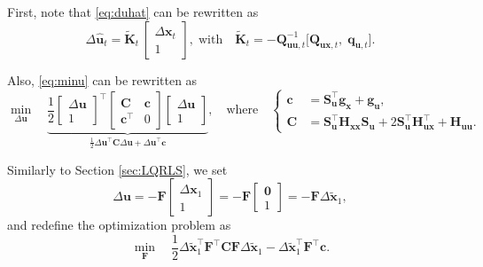 \documentclass[10pt,a4paper]{article} %
\newcommand{\trsp}{{\scriptscriptstyle\top}}
\begin{document}
First, note that \eqref{eq:duhat} can be rewritten as
\begin{equation}
	\Delta\bm{\hat{u}}_t = \bm{\tilde{K}}_t \, \begin{bmatrix} \Delta\bm{x}_t \\ 1 \end{bmatrix},
	\;\text{with}\quad
	\bm{\tilde{K}}_t = - \bm{Q}_{\bm{u}\bm{u},t}^{-1} \Big[ \bm{Q}_{\bm{u}\bm{x},t}, \; \bm{q}_{\bm{u},t} \Big]. 
\label{eq:duhat2}
\end{equation}

Also, \eqref{eq:minu} can be rewritten as
\begin{equation*}
	\min_{\Delta\bm{u}} \quad \underbrace{\frac{1}{2}
	\begin{bmatrix} \Delta\bm{u} \\ 1 \end{bmatrix}^\trsp
	\begin{bmatrix} \bm{C} & \bm{c} \\ \bm{c}^\trsp & 0 \end{bmatrix}
	\begin{bmatrix} \Delta\bm{u} \\ 1 \end{bmatrix}}_{\frac{1}{2} \Delta\bm{u}^\trsp \bm{C} \Delta\bm{u} + \Delta\bm{u}^\trsp \bm{c}},
	\quad\text{where}\quad
	\left\{
	\begin{aligned}
	\bm{c} &= \bm{S}_{\bm{u}}^\trsp \bm{g}_{\bm{x}} + \bm{g}_{\bm{u}}, \\
	\bm{C} &= \bm{S}_{\bm{u}}^\trsp \bm{H}_{\bm{x}\bm{x}} \bm{S}_{\bm{u}} 
	+ 2 \bm{S}_{\bm{u}}^\trsp \bm{H}_{\bm{u}\bm{x}}^\trsp
	+ \bm{H}_{\bm{u}\bm{u}}.
	\end{aligned}
	\right.
\end{equation*}

Similarly to Section \ref{sec:LQRLS}, we set 
\begin{equation}
	\Delta\bm{u} = -\bm{F} \begin{bmatrix} \Delta\bm{x}_1 \\ 1 \end{bmatrix} 
	= -\bm{F} \begin{bmatrix} \bm{0} \\ 1 \end{bmatrix}
	= -\bm{F} \Delta\bm{\tilde{x}}_1, 
\end{equation}
and redefine the optimization problem as
\begin{equation}
	\min_{\bm{F}} \quad \frac{1}{2} \Delta\bm{\tilde{x}}_1^\trsp \bm{F}^\trsp \bm{C} \bm{F} \Delta\bm{\tilde{x}}_1 
	- \Delta\bm{\tilde{x}}_1^\trsp \bm{F}^\trsp \bm{c}.
\end{equation}
\end{document}
